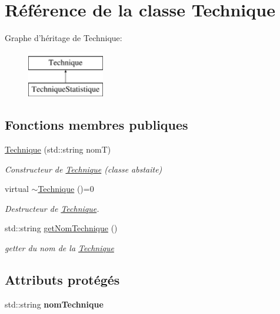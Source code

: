 \hypertarget{classTechnique}{\section{Référence de la classe Technique}
\label{classTechnique}
}
Graphe d'héritage de Technique\-:\begin{figure}[H]
\begin{center}
\leavevmode
\includegraphics[height=2.000000cm]{classTechnique}
\end{center}
\end{figure}
\subsection*{Fonctions membres publiques}
\begin{DoxyCompactItemize}
\item 
\hyperlink{classTechnique_a48988caf322c83fbc5596790f068a69b}{Technique} (std\-::string nom\-T)
\begin{DoxyCompactList}\small\item\em Constructeur de \hyperlink{classTechnique}{Technique} (classe abstaite) \end{DoxyCompactList}\item 
\hypertarget{classTechnique_a98e31009f87eaf1971145162254ef8ae}{virtual \hyperlink{classTechnique_a98e31009f87eaf1971145162254ef8ae}{$\sim$\-Technique} ()=0}\label{classTechnique_a98e31009f87eaf1971145162254ef8ae}

\begin{DoxyCompactList}\small\item\em Destructeur de \hyperlink{classTechnique}{Technique}. \end{DoxyCompactList}\item 
std\-::string \hyperlink{classTechnique_abc365297482e838ddc01804619590a15}{get\-Nom\-Technique} ()
\begin{DoxyCompactList}\small\item\em getter du nom de la \hyperlink{classTechnique}{Technique} \end{DoxyCompactList}\end{DoxyCompactItemize}
\subsection*{Attributs protégés}
\begin{DoxyCompactItemize}
\item 
\hypertarget{classTechnique_a4f7663af14f4954d0d22efdcc1f1b070}{std\-::string {\bfseries nom\-Technique}}\label{classTechnique_a4f7663af14f4954d0d22efdcc1f1b070}

\end{DoxyCompactItemize}


